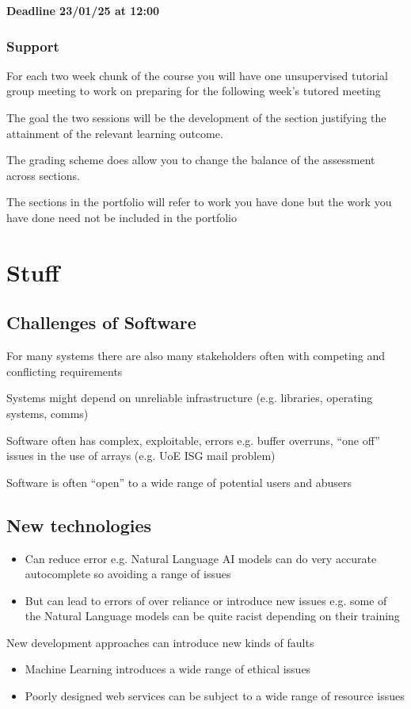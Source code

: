 \documentclass{article}
\begin{document}
\textbf{Deadline 23/01/25 at 12:00}

\subsubsection{Support}

For each two week chunk of the course you will have one unsupervised tutorial group meeting to work on preparing for the following week's tutored meeting

The goal the two sessions will be the development of the section justifying the attainment of the relevant learning outcome.

The grading scheme does allow you to change the balance of the assessment across sections.

The sections in the portfolio will refer to work you have done but the work you have done need not be included in the portfolio

\newpage
\section{Stuff}
\subsection{Challenges of Software}
For many systems there are also many stakeholders often with competing and conflicting requirements

Systems might depend on unreliable infrastructure (e.g. libraries, operating systems, comms)

Software often has complex, exploitable, errors e.g. buffer overruns, ``one off'' issues in the use of arrays (e.g. UoE ISG mail problem)

Software is often ``open'' to a wide range of potential users and abusers

\subsection{New technologies}
\begin{itemize}
    \item Can reduce error e.g. Natural Language AI models can do very accurate autocomplete so avoiding a range of issues
    \item But can lead to errors of over reliance or introduce new issues e.g. some of the Natural Language models can be quite racist depending on their training
\end{itemize}
New development approaches can introduce new kinds of faults
\begin{itemize}
    \item Machine Learning introduces a wide range of ethical issues
    \item Poorly designed web services can be subject to a wide range of resource issues
\end{itemize}
\end{document}
